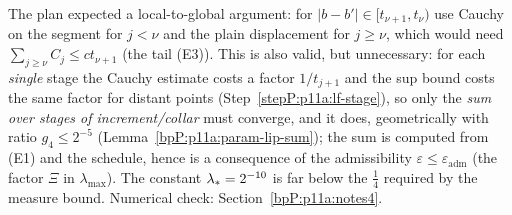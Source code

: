 \begin{remark}[Verdict on R3]\label{bpP:p11a:r3-verdict}
The plan expected a local-to-global argument: for $\lvert b-b'\rvert\in[t_{\nu+1},t_\nu)$ use Cauchy on the segment for $j<\nu$ and the plain displacement for $j\ge\nu$, which would need $\sum_{j\ge\nu}C_j\le ct_{\nu+1}$ (the tail (E3)). This is also valid, but unnecessary: for each \emph{single} stage the Cauchy estimate costs a factor $1/t_{j+1}$ and the sup bound costs the same factor for distant points (Step~\ref{stepP:p11a:lf-stage}), so only the \emph{sum over stages of increment/collar} must converge, and it does, geometrically with ratio $g_4\le2^{-5}$ (Lemma~\ref{bpP:p11a:param-lip-sum}); the sum is computed from (E1) and the schedule, hence is a consequence of the admissibility $\varepsilon\le\varepsilon_{\mathrm{adm}}$ (the factor $\Xi$ in $\lambda_{\max}$). The constant $\lambda_{*}=2^{-10}$ is far below the $\frac14$ required by the measure bound. Numerical check: Section~\ref{bpP:p11a:notes4}.
\end{remark}


